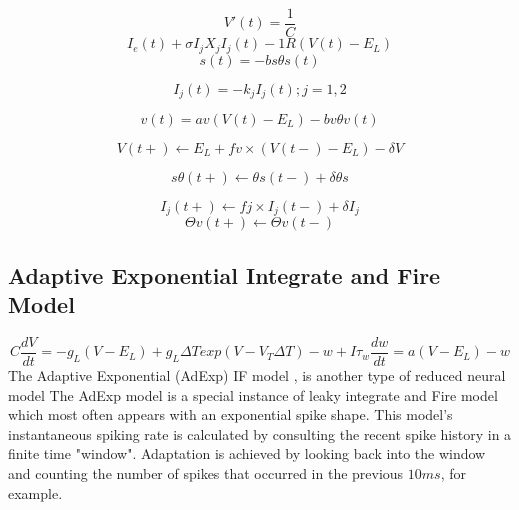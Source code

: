 \begin{equation}
V \prime (t)=\frac{1}{C} 
\end{equation}
\begin{equation}
I_{e}(t) + \sigma I_{j}X_{j}I_{j}(t) -1R(V (t)- E_{L})  \end{equation}
\begin{equation} 
s(t) = -bs \theta s(t)  
\end{equation}

\begin{equation}
I_{j}(t) = -k_{j} I_{j} (t); j = 1, 2  
\end{equation}

\begin{equation}
 v(t) = av(V (t) - E_{L}) - bv\theta v(t) 
\end{equation}

\begin{equation}
V (t+) \leftarrow E_{L} + fv \times (V (t-) - E_{L}) - \delta V 
\end{equation}

\begin{equation}
s \theta (t+) \leftarrow \theta s(t-) + \delta \theta s 
\end{equation}

\begin{equation}
I_{j} (t+) \leftarrow fj \times I_{j} (t-) + \delta I_{j}
\end{equation}
\begin{equation}
\Theta v (t+) \leftarrow \Theta v(t-) 
\end{equation}

\subsection{Adaptive Exponential Integrate and Fire Model}
\begin{displaymath}
 C\frac{dV}{dt}=-g_{L}(V-E_{L})+
g_{L} \Delta Texp(V-V_{T} \Delta T)-w+I 
\tau_{w}\frac{dw}{dt} = a(V-E_{L})-w 
\end{displaymath}
The Adaptive Exponential (AdExp) IF model \cite{brette2005adaptive}, is another type of reduced neural model
The AdExp model is a special instance of leaky integrate and Fire model which most often appears with an exponential spike shape.
This model's instantaneous spiking rate is calculated by consulting the recent spike history in a finite time "window". 
Adaptation is achieved by looking back into the window and counting the number of spikes that occurred in the previous $10ms$, for example. 
